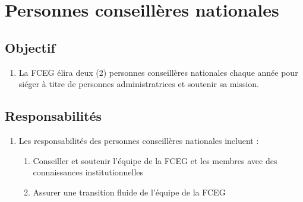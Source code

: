 \section{Personnes conseillères nationales}
\label{personnes-conseilleres-nationales}

\subsection{Objectif}
\label{personnes-conseilleres-nationales-objectif}

\begin{enumerate}
 \item La FCEG élira deux (2) personnes conseillères nationales chaque année pour siéger à titre de personnes administratrices et soutenir sa mission.
\end{enumerate}

\subsection{Responsabilités}
\label{personnes-conseilleres-nationales-responsabilites}

\begin{enumerate}
 \item Les responsabilités des personnes conseillères nationales incluent :
  \begin{enumerate}
   \item Conseiller et soutenir l'équipe de la FCEG et les membres avec des connaissances institutionnelles
   \item Assurer une transition fluide de l'équipe de la FCEG
  \end{enumerate}
\end{enumerate}
